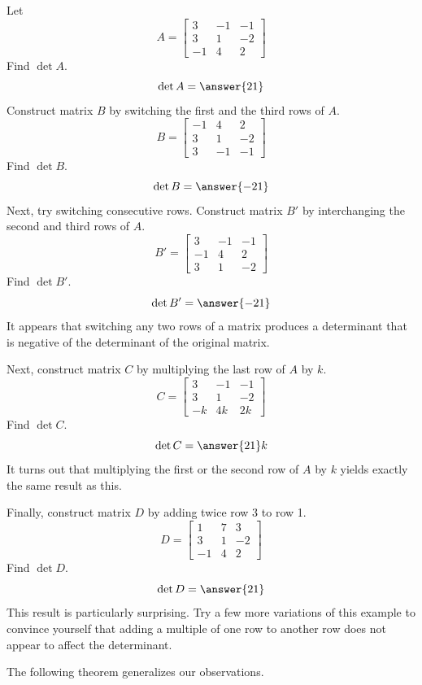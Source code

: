 \documentclass{ximera}
\begin{document}
\begin{exploration}\label{init:rowswap}
Let $$A=\begin{bmatrix}3&-1&-1\\3&1&-2\\-1&4&2\end{bmatrix}$$
Find $\det{A}$.
$$\det{A}=\answer{21}$$
Construct matrix $B$ by switching the first and the third rows of $A$.
$$B=\begin{bmatrix}-1&4&2\\3&1&-2\\3&-1&-1\end{bmatrix}$$
Find $\det{B}$.
$$\det{B}=\answer{-21}$$
Next, try switching consecutive rows.  Construct matrix $B'$ by interchanging the second and third rows of $A$.
$$B'=\begin{bmatrix}3&-1&-1\\-1&4&2\\3&1&-2\end{bmatrix}$$
Find $\det{B'}$.
$$\det{B'}=\answer{-21}$$
It appears that switching any two rows of a matrix produces a determinant that is negative of the determinant of the original matrix.

Next, construct matrix $C$ by multiplying the last row of $A$ by $k$.
$$C=\begin{bmatrix}3&-1&-1\\3&1&-2\\-k&4k&2k\end{bmatrix}$$
Find $\det{C}$.
$$\det{C}=\answer{21}k$$
It turns out that multiplying the first or the second row of $A$ by $k$ yields exactly  the same result as this.

Finally, construct matrix $D$ by  adding twice row 3 to row 1.
$$D=\begin{bmatrix}1&7&3\\3&1&-2\\-1&4&2\end{bmatrix}$$
Find $\det{D}$.
$$\det{D}=\answer{21}$$
This result is particularly surprising.  Try a few more variations of this example to convince yourself that adding a multiple of one row to another row does not appear to affect the determinant.
\end{exploration}

The following theorem generalizes our observations.
\end{document}
